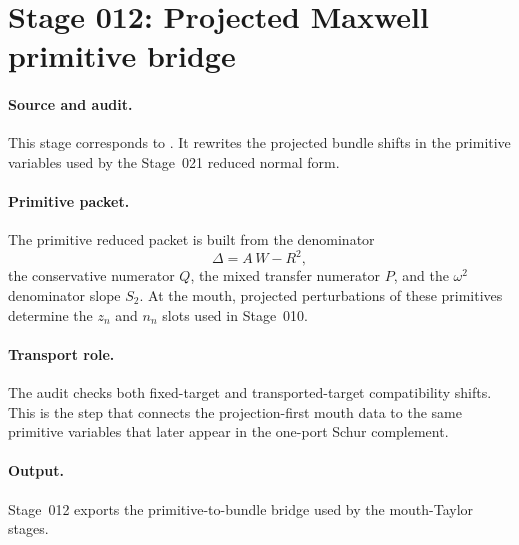 \section[Stage 012]{Stage 012: Projected Maxwell primitive bridge}
\label{stage:012}


\paragraph{Source and audit.}
This stage corresponds to
.
It rewrites the projected bundle shifts in the primitive variables used by the
Stage~021 reduced normal form.

\paragraph{Primitive packet.}
The primitive reduced packet is built from the denominator
\[
\Delta=A\,W-R^2,
\]
the conservative numerator \(Q\), the mixed transfer numerator \(P\), and the
\(\omega^2\) denominator slope \(S_2\).  At the mouth, projected perturbations
of these primitives determine the \(z_n\) and \(n_n\) slots used in
Stage~010.

\paragraph{Transport role.}
The audit checks both fixed-target and transported-target compatibility
shifts.  This is the step that connects the projection-first mouth data to the
same primitive variables that later appear in the one-port Schur complement.

\paragraph{Output.}
Stage~012 exports the primitive-to-bundle bridge used by the mouth-Taylor
stages.
